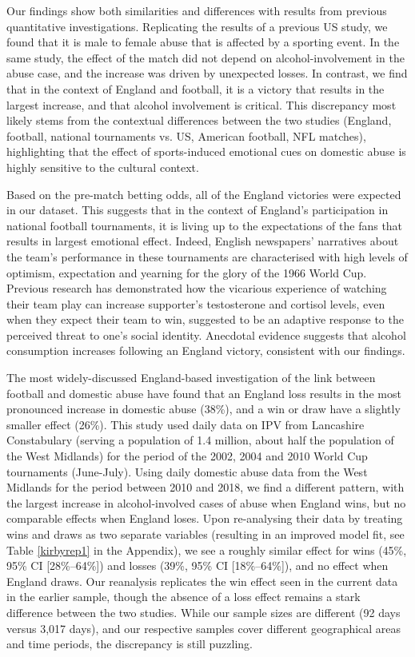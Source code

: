 \documentclass[12pt, letterpaper]{article}
\begin{document}
Our findings show both similarities and differences with results from previous quantitative investigations. Replicating the results of a previous US study, we found that it is male to female abuse that is affected by a sporting event\autocite{Card2011}. In the same study, the effect of the match did not depend on alcohol-involvement in the abuse case, and the increase was driven by unexpected losses. In contrast, we find that in the context of England and football, it is a victory that results in the largest increase, and that alcohol involvement is critical. This discrepancy most likely stems from the contextual differences between the two studies (England, football, national tournaments vs. US, American football, NFL matches), highlighting that the effect of sports-induced emotional cues on domestic abuse is highly sensitive to the cultural context. 

Based on the pre-match betting odds, all of the England victories were expected in our dataset. This suggests that in the context of England's participation in national football tournaments, it is living up to the expectations of the fans that results in largest emotional effect. Indeed, English newspapers' narratives about the team's performance in these tournaments are characterised with high levels of optimism, expectation and yearning for the glory of the 1966 World Cup\autocite{Vincent2010}. Previous research has demonstrated how the vicarious experience of watching their team play can increase supporter's testosterone and cortisol levels, even when they expect their team to win, suggested to be an adaptive response to the perceived threat to one's social identity\autocite{VanderMeij2012}. Anecdotal evidence suggests that alcohol consumption increases following an England victory\autocite{Davies2018}, consistent with our findings.


The most widely-discussed England-based investigation of the link between football and domestic abuse have found that an England loss results in the most pronounced increase in domestic abuse (38\%), and a win or draw have a slightly smaller effect (26\%)\autocite{Kirby2014}. This study used daily data on IPV from Lancashire Constabulary (serving a population of 1.4 million, about half the population of the West Midlands) for the period of the 2002, 2004 and 2010 World Cup tournaments (June-July). 
Using daily domestic abuse data from the West Midlands for the period between 2010 and 2018, we find a different pattern, with the largest increase in alcohol-involved cases of abuse when England wins, but no comparable effects when England loses. Upon re-analysing their data by treating wins and draws as two separate variables (resulting in an improved model fit, see Table \ref{kirbyrep1} in the Appendix), we see a roughly similar effect for wins (45\%, 95\% CI [28\%--64\%]) and losses (39\%, 95\% CI [18\%--64\%]), and no effect when England draws. Our reanalysis replicates the win effect seen in the current data in the earlier sample, though the absence of a loss effect remains a stark difference between the two studies. While our sample sizes are different (92 days versus 3,017 days), and our respective samples cover different geographical areas and time periods, the discrepancy is still puzzling. 
\end{document}
